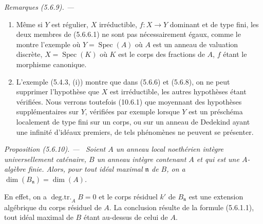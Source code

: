 \documentclass[10pt,oneside]{book}
\newenvironment{proposition}[1][]{%
  \par\medskip\noindent\itshape Proposition (#1). ---\ }{\par}
\newenvironment{remarks}[1][]{%
  \par\medskip\noindent\itshape Remarques (#1). ---\ }{\par}
\begin{document}
\begin{remarks}[5.6.9]
\label{IV.2.s5.6.9-fr}
\begin{enumerate}
\item[(i)] Même si $Y$ est régulier, $X$ irréductible, $f:X\to Y$ dominant
et de type fini, les deux membres de (5.6.6.1) ne sont pas nécessairement
égaux, comme le montre l'exemple où $Y=\operatorname{Spec}(A)$ où $A$ est un
anneau de valuation discrète, $X=\operatorname{Spec}(K)$ où $K$ est le corps
des fractions de $A$, $f$ étant le morphisme canonique.
\item[(ii)] L'exemple (5.4.3, (i)) montre que dans (5.6.6) et (5.6.8), on ne
peut supprimer l'hypothèse que $X$ est irréductible, les autres hypothèses
étant vérifiées. Nous verrons toutefois (10.6.1) que moyennant des hypothèses
supplémentaires sur $Y$, vérifiées par exemple lorsque $Y$ est un préschéma
localement de type fini sur un corps, ou sur un anneau de Dedekind ayant une
infinité d'idéaux premiers, de tels phénomènes ne peuvent se présenter.
\end{enumerate}
\end{remarks}

\begin{proposition}[5.6.10]
\label{IV.2.s5.6.10-fr}
Soient $A$ un anneau local noethérien intègre universellement caténaire, $B$
un anneau intègre contenant $A$ et qui est une $A$-algèbre finie. Alors, pour
tout idéal maximal $\mathfrak n$ de $B$, on a
$\dim(B_{\mathfrak n})=\dim(A)$.
\end{proposition}

En effet, on a $\operatorname{deg.tr.}_A B=0$ et le corps résiduel $k'$ de
$B_{\mathfrak n}$ est une extension algébrique du corps résiduel de
$A$. La conclusion résulte de la formule (5.6.1.1), tout idéal maximal de
$B$ étant au-dessus de celui de $A$.
\end{document}
